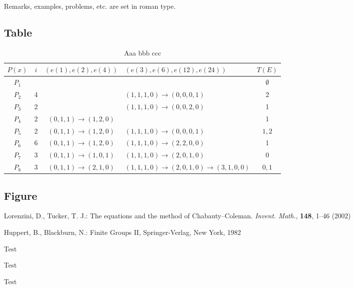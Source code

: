 \documentclass{amse-new}
\numberwithin{equation}{section} %
\begin{document}
\begin{remark}\label{re:1.2}
Remarks, examples, problems, etc. are set in roman type.
\end{remark}


\subsection{Table}

\begin{table}
\begin{tabular}{|c|c|c|l|c|}
\hline $P(x)$ & $i$& $(e(1),e(2),e(4))$ & $(e(3),e(6),e(12),e(24))$ & $T(E)$ \\
\hline $P_1$  &    & & &$\emptyset$ \\
\hline $P_2$  & 4  & & $(1,1,1,0)\rightarrow(0,0,0,1)$ &2\\
\hline $P_3$  & 2  & &$(1,1,1,0)\rightarrow(0,0,2,0)$ &1\\
\hline $P_4$  & 2  & $(0,1,1)\rightarrow(1,2,0)$ & &1\\
\hline $P_5$  & 2  & $(0,1,1)\rightarrow(1,2,0)$ &$(1,1,1,0)\rightarrow(0,0,0,1)$ &$1,2$\\
\hline $P_6$  & 6  & $(0,1,1)\rightarrow(1,2,0)$ &$(1,1,1,0)\rightarrow(2,2,0,0)$ &1\\
\hline $P_7$  & 3  & $(0,1,1)\rightarrow(1,0,1)$ &$(1,1,1,0)\rightarrow(2,0,1,0)$ &0\\
\hline $P_8$  & 3  & $(0,1,1)\rightarrow(2,1,0)$ &$(1,1,1,0)\rightarrow(2,0,1,0) \rightarrow(3,1,0,0)$ &$0,1$\\
\hline
\end{tabular}
\caption{Aaa bbb ccc\label{tab}}
\end{table}


\subsection{Figure}





\begin{thebibliography}{99}

Lorenzini, D., Tucker, T. J.: The equations and the method of
Chabauty--Coleman. \emph{Invent. Math.}, \textbf{148}, 1--46
(2002)

Huppert, B., Blackburn, N.: Finite Groups II, Springer-Verlag, New
York, 1982

Test

Test

Test

\end{thebibliography}
\end{document}

